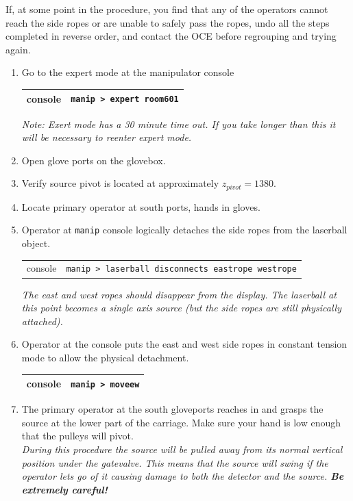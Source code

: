 \documentclass[11pt]{article}
\begin{document}
\begin{enumarate}
If, at some point in the procedure, you find that any of the operators cannot reach the side ropes or are unable to safely pass the ropes, undo all the steps completed in reverse order, and contact the OCE before regrouping and trying again.
\begin{enumerate}
\item \CheckBox[name=dsr1]{} Go to the expert mode at the manipulator console
\begin{center}
\begin{tabular}{|c|c|}
\hline
console & \verb+manip > expert room601+\\
\hline
\end{tabular}
\end{center}
{\it Note: Exert mode has a 30 minute time out. If you take longer than this it will be necessary to reenter expert mode.}
\item \CheckBox[name=dsr2]{} Open glove ports on the glovebox.
\item \CheckBox[name=dsr3]{} Verify source pivot is located at approximately $z_{pivot} = 1380$.
\item \CheckBox[name=dsr4]{} Locate primary operator at south ports, hands in gloves.
\item \CheckBox[name=dsr5]{} Operator at \verb+manip+ console logically detaches the side ropes from the laserball object.
\begin{center}
\begin{tabular}{|c|c|}
console & \verb+manip > laserball disconnects eastrope westrope+ \\
\end{tabular}
\end{center}
{\it The east and west ropes should disappear from the display. The laserball at this point becomes a single axis source (but the side ropes are still physically attached).}
\item \CheckBox[name=dsr6]{} Operator at the console puts the east and west side ropes in constant tension mode to allow the physical detachment.
\begin{center}
\begin{tabular}{|c|c|}
\hline
console & \verb+manip > moveew+\\
\hline
\end{tabular}
\end{center}
\item \CheckBox[name=dsr7]{} The primary operator at the south gloveports reaches in and grasps the source at the lower part of the carriage. Make sure your hand is low enough that the pulleys will pivot. \\ {\it During this procedure the source will be pulled away from its normal vertical position under the gatevalve. This means that the source will swing if the operator lets go of it causing damage to both the detector and the source. {\bf Be extremely careful!}}

\end{enumerate}
\end{enumarate}
\end{document}
